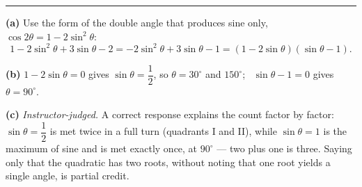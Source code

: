 \documentclass[12pt]{article}
\begin{document}
\vspace{0.12cm}\noindent\rule{\linewidth}{0.2pt}\vspace{0.12cm}


\textbf{(a)} Use the form of the double angle that produces sine only, $\cos 2\theta = 1 - 2\sin^2\theta$:
\[ 1 - 2\sin^2\theta + 3\sin\theta - 2 = -2\sin^2\theta + 3\sin\theta - 1 = (1 - 2\sin\theta)(\sin\theta - 1). \]

\textbf{(b)} $1 - 2\sin\theta = 0$ gives $\sin\theta = \dfrac{1}{2}$, so $\theta = 30^\circ$ and $150^\circ$; \ $\sin\theta - 1 = 0$ gives $\theta = 90^\circ$. 

\textbf{(c)} \emph{Instructor-judged.} A correct response explains the count factor by factor: $\sin\theta = \dfrac{1}{2}$ is met twice in a full turn (quadrants I and II), while $\sin\theta = 1$ is the maximum of sine and is met exactly once, at $90^\circ$ --- two plus one is three. Saying only that the quadratic has two roots, without noting that one root yields a single angle, is partial credit.
\end{document}
